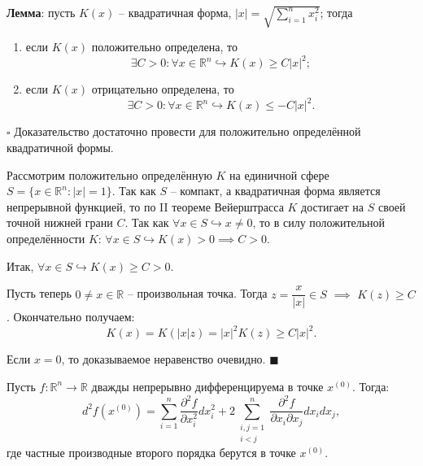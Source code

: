 \documentclass[12pt, a4paper, reqno]{article}
\begin{document}
    \textbf{Лемма}: пусть $K(x)$ -- квадратичная форма, $|x| = \sqrt{\sum\limits_{i = 1}^{n} x_i^2}$;
    тогда
    \begin{enumerate}
        \item если $K(x)$ положительно определена, то
            \begin{equation*}
                \exists C > 0: \forall x \in \mathbb{R}^n \hookrightarrow K(x) \geq C|x|^2;
            \end{equation*}
        \item если $K(x)$ отрицательно определена, то
            \begin{equation*}
                \exists C > 0: \forall x \in \mathbb{R}^n \hookrightarrow K(x) \leq -C|x|^2.
            \end{equation*}
    \end{enumerate}

    $\square$
    Доказательство достаточно провести для положительно определённой квадратичной формы.

    Рассмотрим положительно определённую $K$ на единичной сфере $S = \{x \in \mathbb{R}^n: |x| = 1\}$.
    Так как $S$ -- компакт, а квадратичная форма является непрерывной функцией, то по II теореме
    Вейерштрасса $K$ достигает на $S$ своей точной нижней грани $C$. Так как
    $\forall x \in S \hookrightarrow x \neq 0$, то в силу положительной определённости $K$:
    $\forall x \in S \hookrightarrow K(x) > 0 \implies C > 0$.

    Итак, $\forall x \in S \hookrightarrow K(x) \geq C > 0$.

    Пусть теперь $0 \neq x \in \mathbb{R}$ -- произвольная точка. Тогда $z = \dfrac{x}{|x|} \in S$
    $\implies$ $K(z) \geq C$. Окончательно получаем:
    \begin{equation*}
        K(x) = K(|x|z) = |x|^2 K(z) \geq C|x|^2.
    \end{equation*}

    Если $x = 0$, то доказываемое неравенство очевидно.
    $\blacksquare$

    Пусть $f: \mathbb{R}^n \to \mathbb{R}$ дважды непрерывно дифференцируема в точке $x^{(0)}$.
    Тогда:
    \begin{equation*}
        d^2 f(x^{(0)}) = \sum\limits_{i = 1}^{n} \frac{\partial^2 f}{\partial x_i^2}dx_i^2 +
            2 \sum\limits_{\substack{i, j = 1 \\ i < j}}^{n}
                \frac{\partial^2 f}{\partial x_i \partial x_j} dx_i dx_j,
    \end{equation*}
    где частные производные второго порядка берутся в точке $x^{(0)}$.
\end{document}
